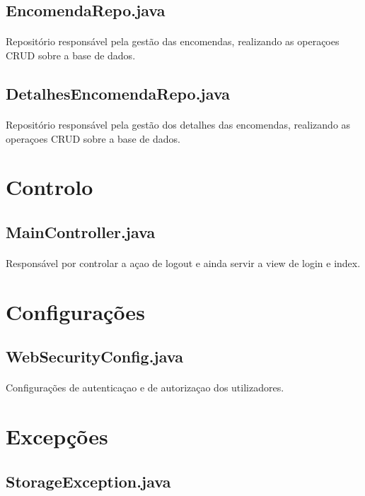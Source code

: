 \documentclass[11pt]{article}
\begin{document}
	\subsection{EncomendaRepo.java}
	\paragraph{}
	Repositório responsável pela gestão das encomendas, realizando as operaçoes CRUD sobre a base de dados.

	\subsection{DetalhesEncomendaRepo.java}
	\paragraph{}
	Repositório responsável pela gestão dos detalhes das encomendas, realizando as operaçoes CRUD sobre a base de dados.
	
\section{Controlo}
	\subsection{MainController.java}
	\paragraph{}
	Responsável por controlar a açao de logout e ainda servir a view de login e index.

	
\section{Configurações}
	\subsection{WebSecurityConfig.java}
	\paragraph{}
	Configurações de autenticaçao e de autorizaçao dos utilizadores.

\section{Excepções}
	\subsection{StorageException.java}
\end{document}
